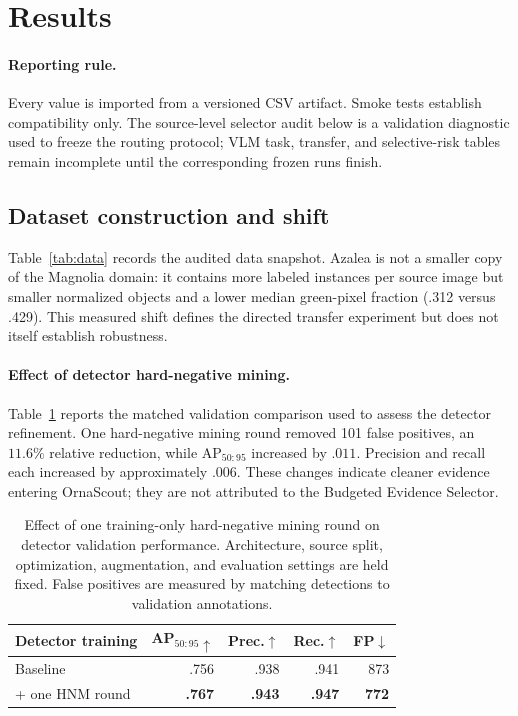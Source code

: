 \section{Results}
\paragraph{Reporting rule.}
Every value is imported from a versioned CSV artifact. Smoke tests establish compatibility only. The source-level selector audit below is a validation diagnostic used to freeze the routing protocol; VLM task, transfer, and selective-risk tables remain incomplete until the corresponding frozen runs finish.

\subsection{Dataset construction and shift}
Table~\ref{tab:data} records the audited data snapshot. Azalea is not a smaller copy of the Magnolia domain: it contains more labeled instances per source image but smaller normalized objects and a lower median green-pixel fraction (.312 versus .429). This measured shift defines the directed transfer experiment but does not itself establish robustness.

\paragraph{Effect of detector hard-negative mining.}
Table~\ref{tab:hnm} reports the matched validation comparison used to assess the detector refinement. One hard-negative mining round removed 101 false positives, an $11.6\%$ relative reduction, while AP$_{50{:}95}$ increased by $.011$. Precision and recall each increased by approximately $.006$. These changes indicate cleaner evidence entering OrnaScout; they are not attributed to the Budgeted Evidence Selector.

\begin{table}[t]
\centering
\wacvtablefont
\caption{Effect of one training-only hard-negative mining round on detector validation performance. Architecture, source split, optimization, augmentation, and evaluation settings are held fixed. False positives are measured by matching detections to validation annotations.}
\label{tab:hnm}
\setlength{\tabcolsep}{4.2pt}
\begin{tabular}{lrrrr}
\toprule
Detector training & AP$_{50{:}95}\uparrow$ & Prec.$\uparrow$ & Rec.$\uparrow$ & FP$\downarrow$ \\
\midrule
Baseline & .756 & .938 & .941 & 873 \\
+ one HNM round & \textbf{.767} & \textbf{.943} & \textbf{.947} & \textbf{772} \\
\bottomrule
\end{tabular}
\end{table}

